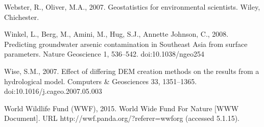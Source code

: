 \begin{thebibliography}
\bibitem{} \hangindent=1cm Webster, R., Oliver, M.A., 2007. Geostatistics for environmental scientists. Wiley, Chichester.

\bibitem{} \hangindent=1cm Winkel, L., Berg, M., Amini, M., Hug, S.J., Annette Johnson, C., 2008. Predicting groundwater arsenic contamination in Southeast Asia from surface parameters. Nature Geoscience 1, 536–542. doi:10.1038/ngeo254

\bibitem{} \hangindent=1cm Wise, S.M., 2007. Effect of differing DEM creation methods on the results from a hydrological model. Computers & Geosciences 33, 1351–1365. doi:10.1016/j.cageo.2007.05.003

\bibitem{} \hangindent=1cm World Wildlife Fund (WWF), 2015. World Wide Fund For Nature [WWW Document]. URL http://wwf.panda.org/?referer=wwforg (accessed 5.1.15).

\end{thebibliography}

\endgroup
